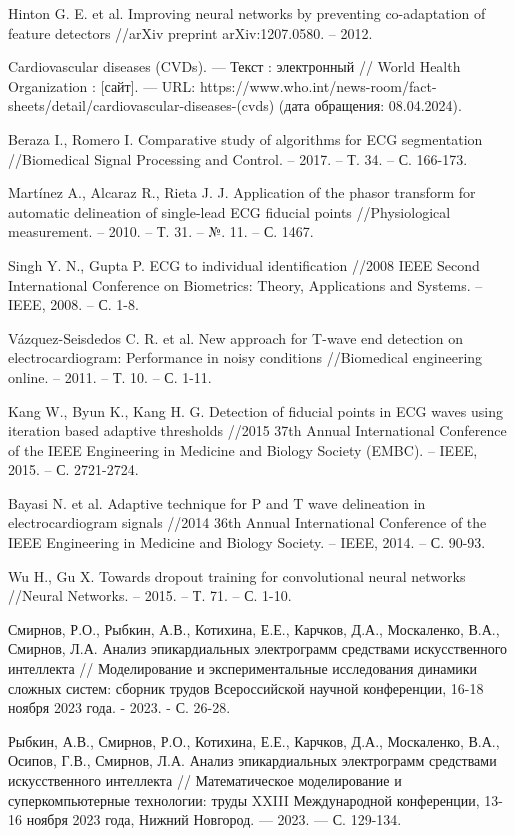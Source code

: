 \begin{thebibliography}{00}
	Hinton G. E. et al. Improving neural networks by preventing co-adaptation
	of feature detectors //arXiv preprint arXiv:1207.0580. – 2012.

	Cardiovascular diseases (CVDs). --- Текст : электронный // World Health
	Organization : [сайт]. --- URL:
	https://www.who.int/news-room/fact-sheets/detail/cardiovascular-diseases-(cvds)
	(дата обращения: 08.04.2024).

	Beraza I., Romero I. Comparative study of algorithms for ECG segmentation
	//Biomedical Signal Processing and Control. – 2017. – Т. 34. – С. 166-173.

	Martínez A., Alcaraz R., Rieta J. J. Application of the phasor transform
	for automatic delineation of single-lead ECG fiducial points
	//Physiological measurement. – 2010. – Т. 31. – №. 11. – С. 1467.

	Singh Y. N., Gupta P. ECG to individual identification //2008 IEEE Second
	International Conference on Biometrics: Theory, Applications and Systems. –
	IEEE, 2008. – С. 1-8.

	Vázquez-Seisdedos C. R. et al. New approach for T-wave end detection on
	electrocardiogram: Performance in noisy conditions //Biomedical engineering
	online. – 2011. – Т. 10. – С. 1-11.

	Kang W., Byun K., Kang H. G. Detection of fiducial points in ECG waves
	using iteration based adaptive thresholds //2015 37th Annual International
	Conference of the IEEE Engineering in Medicine and Biology Society (EMBC).
	– IEEE, 2015. – С. 2721-2724.

	Bayasi N. et al. Adaptive technique for P and T wave delineation in
	electrocardiogram signals //2014 36th Annual International Conference of
	the IEEE Engineering in Medicine and Biology Society. – IEEE, 2014. – С.
	90-93.

	Wu H., Gu X. Towards dropout training for convolutional neural networks
	//Neural Networks. – 2015. – Т. 71. – С. 1-10.

	Смирнов, Р.О., Рыбкин, А.В., Котихина, Е.Е., Карчков, Д.А., Москаленко,
	В.А., Смирнов, Л.А. Анализ эпикардиальных электрограмм средствами
	искусственного интеллекта // Моделирование и экспериментальные исследования
	динамики сложных систем: сборник трудов Всероссийской научной конференции,
	16-18 ноября 2023 года. - 2023. - С. 26-28.

	Рыбкин, А.В., Смирнов, Р.О., Котихина, Е.Е., Карчков, Д.А., Москаленко, В.А.,
	Осипов, Г.В., Смирнов, Л.А. Анализ эпикардиальных электрограмм средствами
	искусственного интеллекта // Математическое моделирование и суперкомпьютерные
	технологии: труды XXIII Международной конференции, 13-16 ноября 2023 года,
	Нижний Новгород. — 2023. — С. 129-134.

\end{thebibliography}
\endgroup
